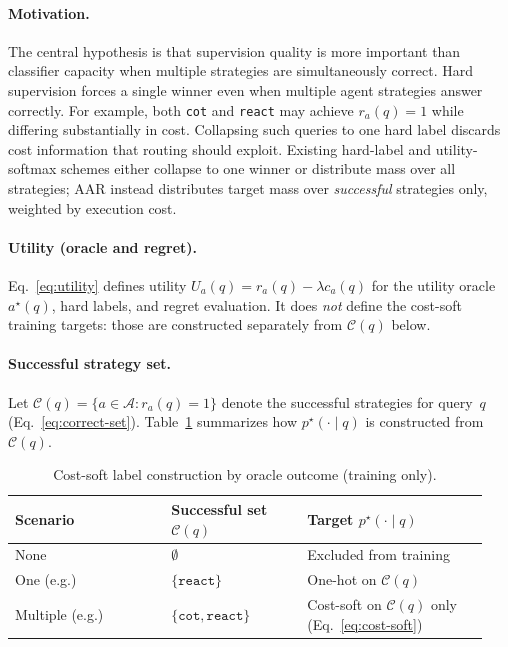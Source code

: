 \paragraph{Motivation.}
The central hypothesis is that supervision quality is more important than classifier capacity
when multiple strategies are simultaneously correct.
Hard supervision forces a single winner even when multiple agent strategies answer correctly.
For example, both \texttt{cot} and \texttt{react} may achieve $r_a(q)=1$ while differing
substantially in cost.
Collapsing such queries to one hard label discards cost information that routing should
exploit.
Existing hard-label and utility-softmax schemes either collapse to one winner or distribute
mass over all strategies; AAR instead distributes target mass over \emph{successful} strategies
only, weighted by execution cost.

\paragraph{Utility (oracle and regret).}
Eq.~\ref{eq:utility} defines utility $U_a(q)=r_a(q)-\lambda c_a(q)$ for the utility oracle
$a^\star(q)$, hard labels, and regret evaluation.
It does \emph{not} define the cost-soft training targets: those are constructed separately from
$\mathcal{C}(q)$ below.

\paragraph{Successful strategy set.}
Let $\mathcal{C}(q)=\{a\in\mathcal{A}: r_a(q)=1\}$ denote the successful strategies for
query~$q$ (Eq.~\ref{eq:correct-set}).
Table~\ref{tab:cost-soft-cases} summarizes how $p^\star(\cdot\mid q)$ is constructed from
$\mathcal{C}(q)$.

\begin{table}[t]
  \centering
  \footnotesize
  \setlength{\tabcolsep}{3pt}
  \renewcommand{\arraystretch}{1.12}
  \caption{Cost-soft label construction by oracle outcome (training only).}
  \label{tab:cost-soft-cases}
  \begin{tabular}{@{}p{0.31\linewidth}p{0.27\linewidth}p{0.36\linewidth}@{}}
    \toprule
    Scenario & Successful set $\mathcal{C}(q)$ & Target $p^\star(\cdot\mid q)$ \\
    \midrule
    None & $\emptyset$ & Excluded from training \\
    One (e.g.) & $\{\texttt{react}\}$ & One-hot on $\mathcal{C}(q)$ \\
    Multiple (e.g.) & $\{\texttt{cot},\texttt{react}\}$ &
      Cost-soft on $\mathcal{C}(q)$ only (Eq.~\ref{eq:cost-soft}) \\
    \bottomrule
  \end{tabular}
\end{table}

